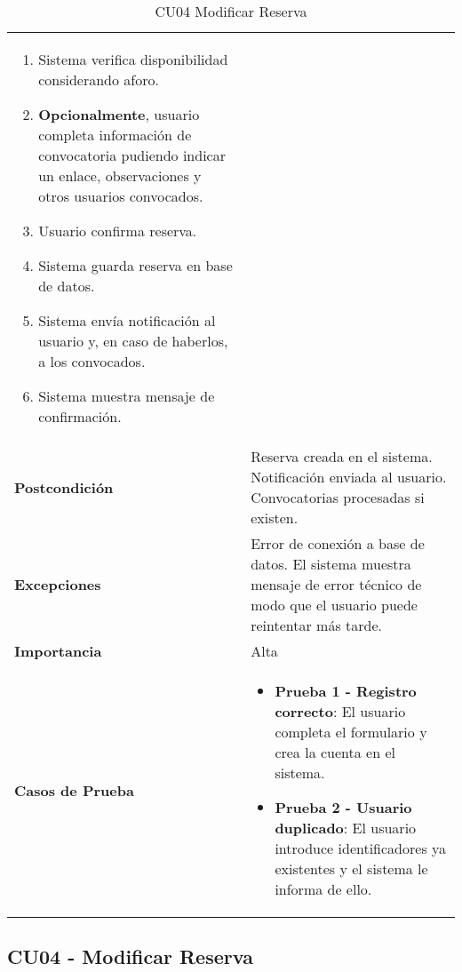\begin{table}[H]
\begin{tabularx}{\linewidth}{ p{} p{} }
\begin{enumerate}
\begin{itemize}
  		\end{itemize}
            \item Sistema verifica disponibilidad considerando aforo.
            \item \textbf{Opcionalmente}, usuario completa información de convocatoria pudiendo indicar un enlace, observaciones y otros usuarios convocados.
            \item Usuario confirma reserva.
            \item Sistema guarda reserva en base de datos.
            \item Sistema envía notificación al usuario y, en caso de haberlos, a los convocados.
            \item Sistema muestra mensaje de confirmación.
		\end{enumerate}\\
		\textbf{Postcondición}        & Reserva creada en el sistema. Notificación enviada al usuario. Convocatorias procesadas si existen.\\
		\textbf{Excepciones}          & Error de conexión a base de datos. El sistema muestra mensaje de error técnico de modo que el usuario puede reintentar más tarde.\\
		\textbf{Importancia}          & Alta \\
		\textbf{Casos de Prueba}      &
		\begin{itemize}
			\item \textbf{Prueba 1 - Registro correcto}: El usuario completa el formulario y crea la cuenta en el sistema.
			\item \textbf{Prueba 2 - Usuario duplicado}: El usuario introduce identificadores ya existentes y el sistema le informa de ello.
		\end{itemize} \\
		\bottomrule
	\end{tabularx}
	\caption{CU04 Modificar Reserva}
	\label{cu:crear-reserva}
\end{table}

\subsection{CU04 - Modificar Reserva}

